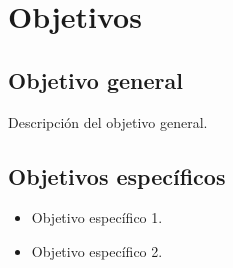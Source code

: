 \chapter{Objetivos}

\section{Objetivo general}
Descripción del objetivo general.

\section{Objetivos específicos}
\begin{itemize}
  \item Objetivo específico 1.
  \item Objetivo específico 2.
\end{itemize}
